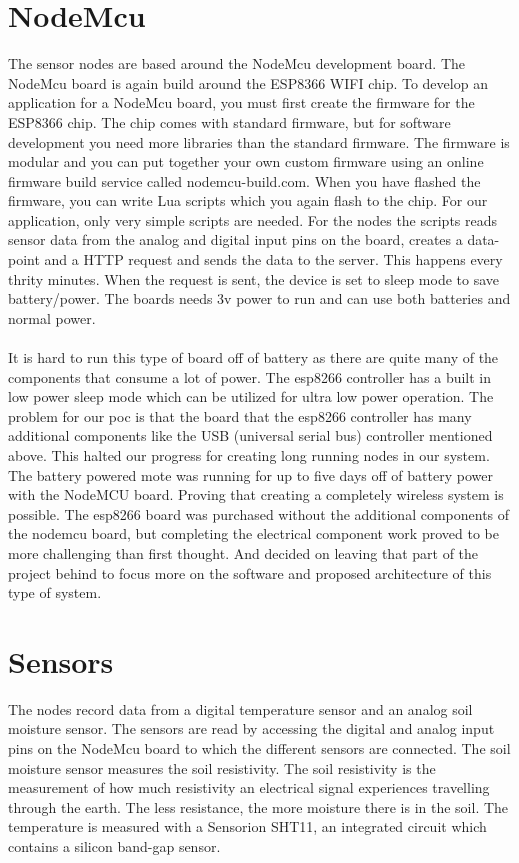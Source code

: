 \documentclass[]{uiophd}
\begin{document}
\section{NodeMcu}
The sensor nodes are based around the NodeMcu development board. The NodeMcu board is again build around the ESP8366 WIFI chip. To develop an application for a NodeMcu board, you must first create the firmware for the ESP8366 chip. The chip comes with standard firmware, but for software development you need more libraries than the standard firmware. The firmware is modular and you can put together your own custom firmware using an online firmware build service called nodemcu-build.com. When you have flashed the firmware, you can write Lua scripts which you again flash to the chip. For our application, only very simple scripts are needed. For the nodes the scripts reads sensor data from the analog and digital input pins on the board, creates a data-point and a HTTP request and sends the data to the server. This happens every thrity minutes.  When the request is sent, the device is set to sleep mode to save battery/power. The boards needs 3v power to run and can use both batteries and normal power.
\\\\
It is hard to run this type of board off of battery as there are quite many of the components that consume a lot of power. The esp8266 controller has a built in low power sleep mode which can be utilized for ultra low power operation. The problem for our poc is that the board that the esp8266 controller has many additional components like the USB (universal serial bus) controller mentioned above. This halted our progress for creating long running nodes in our system. The battery powered mote was running for up to five days off of battery power with the NodeMCU board. Proving that creating a completely wireless system is possible. The esp8266 board was purchased without the additional components of the nodemcu board, but completing the electrical component work proved to be more challenging than first thought. And decided on leaving that part of the project behind to focus more on the software and proposed architecture of this type of system.

\section{Sensors}
The nodes record data from a digital temperature sensor and an analog soil moisture sensor. The sensors are read by accessing the digital and analog input pins on the NodeMcu board to which the different sensors are connected. The soil moisture sensor measures the soil resistivity. The soil resistivity is the measurement of how much resistivity an electrical signal experiences travelling through the earth. The less resistance, the more moisture there is in the soil. The temperature is measured with a Sensorion SHT11, an integrated circuit which contains a silicon band-gap sensor. \cite{sensorion}
\end{document}
